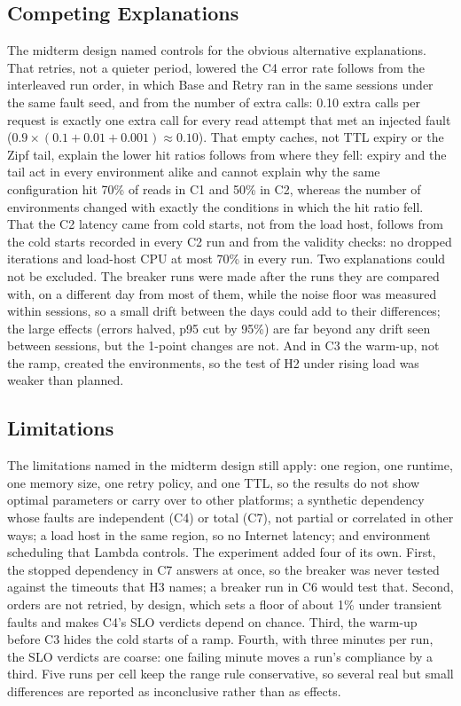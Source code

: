 \documentclass[10pt]{article}
\begin{document}
\subsection{Competing Explanations}
The midterm design named controls for the obvious alternative explanations.
That retries, not a quieter period, lowered the C4 error rate follows from the
interleaved run order, in which Base and Retry ran in the same sessions under
the same fault seed, and from the number of extra calls: 0.10 extra calls per
request is exactly one extra call for every read attempt that met an injected
fault ($0.9 \times (0.1 + 0.01 + 0.001) \approx 0.10$). That empty
caches, not TTL expiry or the Zipf tail, explain the lower hit ratios follows
from where they fell: expiry and the tail act in every environment alike and
cannot explain why the same configuration hit 70\% of reads in C1 and 50\% in
C2, whereas the number of environments changed with exactly the conditions in
which the hit ratio fell. That the C2 latency came from cold starts, not from
the load host, follows from the cold starts recorded in every C2 run and from
the validity checks: no dropped iterations and load-host CPU at most 70\% in
every run. Two
explanations could not be excluded. The breaker runs were made after the runs they
are compared with, on a different day from most of them, while the noise floor was measured within
sessions, so a small drift between the days could add to their differences;
the large effects (errors halved, p95 cut by 95\%) are far beyond any drift
seen between sessions, but the 1-point changes are not. And in C3 the warm-up,
not the ramp, created the environments, so the test of H2 under rising load
was weaker than planned.

\subsection{Limitations}
The limitations named in the midterm design still apply: one region, one
runtime, one memory size, one retry policy, and one TTL, so the results do not
show optimal parameters or carry over to other platforms; a synthetic
dependency whose faults are independent (C4) or total (C7), not partial or
correlated in other ways; a load host in the same region, so no Internet
latency; and environment scheduling that Lambda controls. The experiment added
four of its own. First, the stopped dependency in C7 answers at once, so the
breaker was never tested against the timeouts that H3 names; a breaker run in
C6 would test that. Second, orders are not retried, by design, which sets a
floor of about 1\% under transient faults and makes C4's SLO verdicts depend on
chance. Third, the warm-up before C3 hides the cold starts of a ramp. Fourth,
with three minutes per run, the SLO verdicts are coarse: one failing minute
moves a run's compliance by a third. Five runs per cell keep the range rule
conservative, so several real but small differences are reported as
inconclusive rather than as effects.
\end{document}
